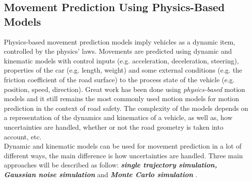 \subsection{Movement Prediction Using Physics-Based Models}
\label{subsection:phb}

Physics-based movement prediction models imply vehicles as a dynamic item, controlled by the physics' laws. Movements are predicted using dynamic and kinematic models with control inputs (e.g. acceleration, deceleration, steering), properties of the car (e.g. length, weight) and some external conditions (e.g. the friction coefficient of the road surface) to the process state of the vehicle (e.g. position, speed, direction). Great work has been done using \textit{physics-based} motion models and it still remains the most commonly used motion models for motion prediction in the context of road safety. The complexity of the models depends on a representation of the dynamics and kinematics of a vehicle, as well as, how uncertainties are handled, whether or not the road geometry is taken into account, etc. \\

Dynamic and kinematic models can be used for movement prediction in a lot of different ways, the main difference is how uncertainties are handled. Three main approaches will be described as follow: \textbf{\textit{single trajectory simulation, Gaussian noise simulation}} and \textbf{\textit{Monte Carlo simulation}} \cite{ClassificationI}.

